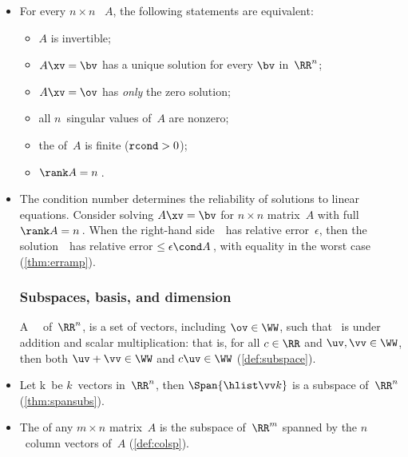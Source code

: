 \begin{itemize}
\itemhi The  of a matrix~$A$ is the number of \emph{nonzero} {singular value}s in an~\svd, \(A=\usv\) (\cref{def:rank}).

\itemme For every matrix~\(A\), let an \svd\ of~\(A\) be~\(\usv\), then the transpose~\(\tr A\) has an \svd\ of \(V(\tr S)\tr U\) (\cref{thm:ranktr}). 
Further, \(\rank(\tr A)=\rank A\)\,.

\item For every \(n\times n\) ~\(A\), the following statements are equivalent: 
\begin{itemize}
\item \(A\) is {invertible};
\item \(A\xv=\bv\) has a {unique solution} for every \(\bv\) in~\(\RR^n\);
\item \(A\xv=\ov\) has \emph{only} the zero solution;
\item all \(n\)~{singular value}s of~\(A\) are nonzero;
\item the  of~\(A\) is finite (\(\verb|rcond|>0\));
\item \(\rank A=n\)\,.
\end{itemize}

\item The condition number determines the reliability of solutions to linear equations.
Consider solving \(A\xv=\bv\) for \(n\times n\) matrix~\(A\) with full \(\rank A=n\)\,.  
When the right-hand side~\bv\ has relative error~\(\epsilon\), then the solution~\xv\ has relative error\({}\leq\epsilon\cond A\)\,, with equality in the worst case (\cref{thm:erramp}).





\subsubsection{Subspaces, basis, and dimension}

\itemhi A ~\WW\ of~\(\RR^n\),  is a set of vectors, including \(\ov\in\WW\), such that \WW\ is  under addition and scalar multiplication: that is, for all \(c\in\RR\) and \(\uv,\vv\in\WW\), then both \(\uv+\vv\in\WW\) and \(c\uv\in\WW\) (\cref{def:subspace}).

\item Let \hlist\vv k\ be \(k\)~vectors in~\(\RR^n\),
then \(\Span\{\hlist\vv k\}\) is a {subspace} of~\(\RR^n\) (\cref{thm:spansubs}).

\item The  of any $m\times n$ matrix~$A$ is the {subspace} of~$\RR^m$ {span}ned by the \(n\)~{column vector}s of~$A$ (\cref{def:colsp}).
        

\end{itemize}
